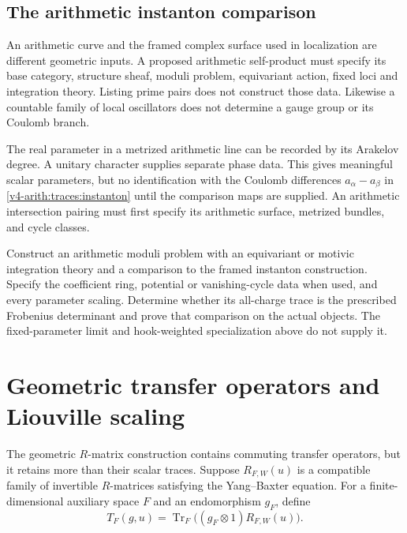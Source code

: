 \subsection{The arithmetic instanton comparison}

An arithmetic curve and the framed complex surface used in localization are
different geometric inputs. A proposed arithmetic self-product must specify
its base category, structure sheaf, moduli problem, equivariant action,
fixed loci and integration theory. Listing prime pairs does not construct
those data. Likewise a countable family of local oscillators does not
determine a gauge group or its Coulomb branch.

The real parameter in a metrized arithmetic line can be recorded by its
Arakelov degree. A unitary character supplies separate phase data. This
gives meaningful scalar parameters, but no identification with the Coulomb
differences $a_\alpha-a_\beta$ in \eqref{v4-arith:traces:instanton} until
the comparison maps are supplied. An arithmetic intersection pairing must
first specify its arithmetic surface, metrized bundles, and cycle classes.

\begin{question}
\label{v4-arith:traces:arithmetic-instantons}
Construct an arithmetic moduli problem with an equivariant or motivic
integration theory and a comparison to the framed instanton construction.
Specify the coefficient ring, potential or vanishing-cycle data when used,
and every parameter scaling. Determine whether its all-charge trace is the
prescribed Frobenius determinant and prove that comparison on the actual
objects. The fixed-parameter limit and hook-weighted specialization above do
not supply it.
\end{question}

\section{Geometric transfer operators and Liouville scaling}

The geometric $R$-matrix construction contains commuting transfer operators,
but it retains more than their scalar traces. Suppose $R_{F,W}(u)$ is a
compatible family of invertible $R$-matrices satisfying the Yang--Baxter
equation. For a finite-dimensional auxiliary space $F$ and an endomorphism
$g_F$, define
\[
 T_F(g,u)=\operatorname{Tr}_F
                  \bigl((g_F\otimes1)R_{F,W}(u)\bigr).
\]

